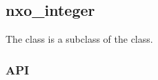 %
%
%
%
%              

\subsection{nxo\_integer}
\label{nxo_integer}

The  class is a subclass of the  class.

\subsubsection{API}

